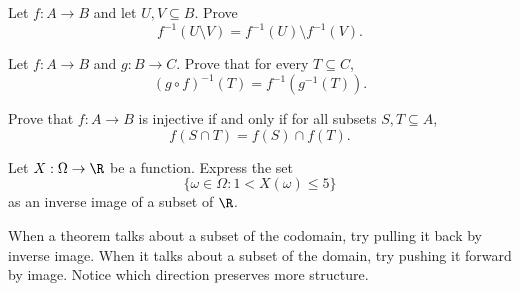 \begin{exercise}
Let $f:A\to B$ and let $U,V\subseteq B$. Prove
\[
f^{-1}(U\setminus V)=f^{-1}(U)\setminus f^{-1}(V).
\]
\end{exercise}

\begin{exercise}
Let $f:A\to B$ and $g:B\to C$. Prove that for every $T\subseteq C$,
\[
(g\circ f)^{-1}(T)=f^{-1}(g^{-1}(T)).
\]
\end{exercise}

\begin{exercise}
Prove that $f:A\to B$ is injective if and only if for all subsets $S,T\subseteq A$,
\[
f(S\cap T)=f(S)\cap f(T).
\]
\end{exercise}

\begin{exercise}
Let $X:\Omega\to\R$ be a function. Express the set
\[
\{\omega\in\Omega:1<X(\omega)\leq 5\}
\]
as an inverse image of a subset of $\R$.
\end{exercise}

\begin{walkbox}
When a theorem talks about a subset of the codomain, try pulling it back by inverse image. When it talks about a subset of the domain, try pushing it forward by image. Notice which direction preserves more structure.
\end{walkbox}

